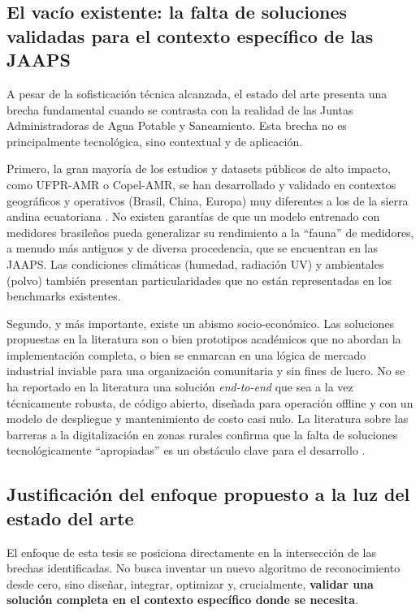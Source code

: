 \subsection{El vacío existente: la falta de soluciones validadas para el contexto específico de las JAAPS}
\label{ssec:identified_gap}

A pesar de la sofisticación técnica alcanzada, el estado del arte presenta una brecha fundamental cuando se contrasta con la realidad de las Juntas Administradoras de Agua Potable y Saneamiento. Esta brecha no es principalmente tecnológica, sino contextual y de aplicación.

Primero, la gran mayoría de los estudios y datasets públicos de alto impacto, como UFPR-AMR o Copel-AMR, se han desarrollado y validado en contextos geográficos y operativos (Brasil, China, Europa) muy diferentes a los de la sierra andina ecuatoriana \parencite{Laroca2021Towards, Liang2022Research}. No existen garantías de que un modelo entrenado con medidores brasileños pueda generalizar su rendimiento a la ``fauna'' de medidores, a menudo más antiguos y de diversa procedencia, que se encuentran en las JAAPS. Las condiciones climáticas (humedad, radiación UV) y ambientales (polvo) también presentan particularidades que no están representadas en los benchmarks existentes.

Segundo, y más importante, existe un abismo socio-económico. Las soluciones propuestas en la literatura son o bien prototipos académicos que no abordan la implementación completa, o bien se enmarcan en una lógica de mercado industrial inviable para una organización comunitaria y sin fines de lucro. No se ha reportado en la literatura una solución \textit{end-to-end} que sea a la vez técnicamente robusta, de código abierto, diseñada para operación offline y con un modelo de despliegue y mantenimiento de costo casi nulo. La literatura sobre las barreras a la digitalización en zonas rurales confirma que la falta de soluciones tecnológicamente ``apropiadas'' es un obstáculo clave para el desarrollo \parencite{Fieldeke2021}.

\subsection{Justificación del enfoque propuesto a la luz del estado del arte}
\label{ssec:project_justification}

El enfoque de esta tesis se posiciona directamente en la intersección de las brechas identificadas. No busca inventar un nuevo algoritmo de reconocimiento desde cero, sino diseñar, integrar, optimizar y, crucialmente, \textbf{validar una solución completa en el contexto específico donde se necesita}.


